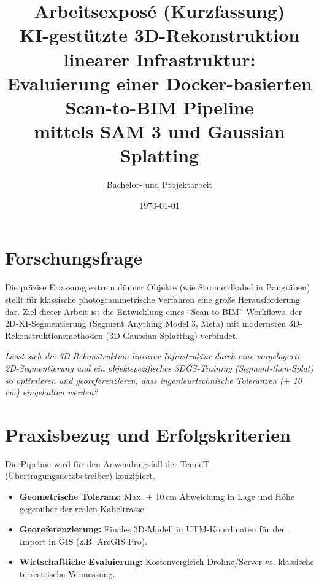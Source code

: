 \documentclass[12pt,a4paper]{article}
\title{\textbf{Arbeitsexposé (Kurzfassung)}\\KI-gestützte 3D-Rekonstruktion linearer Infrastruktur:\\Evaluierung einer Docker-basierten Scan-to-BIM Pipeline\\mittels SAM 3 und Gaussian Splatting}
\author{Bachelor- und Projektarbeit}
\date{\today}
\begin{document}
\maketitle

\section{Forschungsfrage}
Die präzise Erfassung extrem dünner Objekte (wie Stromerdkabel in Baugräben) stellt für klassische photogrammetrische Verfahren eine große Herausforderung dar. Ziel dieser Arbeit ist die Entwicklung eines ``Scan-to-BIM''-Workflows, der 2D-KI-Segmentierung (Segment Anything Model 3, Meta) mit modernsten 3D-Rekonstruktionsmethoden (3D Gaussian Splatting) verbindet.

\textit{Lässt sich die 3D-Rekonstruktion linearer Infrastruktur durch eine vorgelagerte 2D-Segmentierung und ein objektspezifisches 3DGS-Training (Segment-then-Splat) so optimieren und georeferenzieren, dass ingenieurtechnische Toleranzen ($\pm$ 10\,cm) eingehalten werden?}

\section{Praxisbezug und Erfolgskriterien}
Die Pipeline wird für den Anwendungsfall der TenneT (Übertragungsnetzbetreiber) konzipiert.
\begin{itemize}[noitemsep]
    \item \textbf{Geometrische Toleranz:} Max. $\pm$ 10\,cm Abweichung in Lage und Höhe gegenüber der realen Kabeltrasse.
    \item \textbf{Georeferenzierung:} Finales 3D-Modell in UTM-Koordinaten für den Import in GIS (z.B. ArcGIS Pro).
    \item \textbf{Wirtschaftliche Evaluierung:} Kostenvergleich Drohne/Server vs. klassische terrestrische Vermessung.
\end{itemize}
\end{document}
